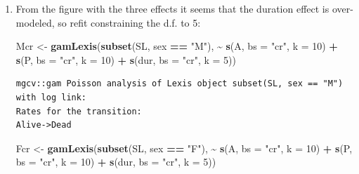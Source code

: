 \documentclass[
]{book}
\newenvironment{Shaded}{\begin{snugshade}}{\end{snugshade}}
\newcommand{\AttributeTok}[1]{\textcolor[rgb]{0.13,0.29,0.53}{#1}}
\newcommand{\DecValTok}[1]{\textcolor[rgb]{0.00,0.00,0.81}{#1}}
\newcommand{\FunctionTok}[1]{\textcolor[rgb]{0.13,0.29,0.53}{\textbf{#1}}}
\newcommand{\NormalTok}[1]{#1}
\newcommand{\OtherTok}[1]{\textcolor[rgb]{0.56,0.35,0.01}{#1}}
\newcommand{\SpecialCharTok}[1]{\textcolor[rgb]{0.81,0.36,0.00}{\textbf{#1}}}
\newcommand{\StringTok}[1]{\textcolor[rgb]{0.31,0.60,0.02}{#1}}
\theoremstyle{definition}
\theoremstyle{definition}
\theoremstyle{definition}
\theoremstyle{definition}
\theoremstyle{remark}
\begin{document}
\begin{enumerate}
  Now take a look at the result from the \texttt{ci.pred} statement and
  construct prediction of mortality for men and women diagnosed in a
  range of ages, say 50, 60, 70, and plot these together in the same
  graph:

\begin{Shaded}
\begin{Highlighting}[]
\FunctionTok{cbind}\NormalTok{(nd, }\FunctionTok{ci.pred}\NormalTok{(Mcr, }\AttributeTok{newdata =}\NormalTok{ nd))[}\DecValTok{1}\SpecialCharTok{:}\DecValTok{10}\NormalTok{,]}
\end{Highlighting}
\end{Shaded}
\item
  From the figure with the three effects it seems that the duration effect is
  over-modeled, so refit constraining the d.f. to 5:

\begin{Shaded}
\begin{Highlighting}[]
\NormalTok{Mcr }\OtherTok{\textless{}{-}} \FunctionTok{gamLexis}\NormalTok{(}\FunctionTok{subset}\NormalTok{(SL, sex }\SpecialCharTok{==} \StringTok{"M"}\NormalTok{),}
                 \SpecialCharTok{\textasciitilde{}} \FunctionTok{s}\NormalTok{(A, }\AttributeTok{bs =} \StringTok{"cr"}\NormalTok{, }\AttributeTok{k =} \DecValTok{10}\NormalTok{) }\SpecialCharTok{+}
                   \FunctionTok{s}\NormalTok{(P, }\AttributeTok{bs =} \StringTok{"cr"}\NormalTok{, }\AttributeTok{k =} \DecValTok{10}\NormalTok{) }\SpecialCharTok{+}
                 \FunctionTok{s}\NormalTok{(dur, }\AttributeTok{bs =} \StringTok{"cr"}\NormalTok{, }\AttributeTok{k =} \DecValTok{5}\NormalTok{))}
\end{Highlighting}
\end{Shaded}

\begin{verbatim}
mgcv::gam Poisson analysis of Lexis object subset(SL, sex == "M") with log link:
Rates for the transition:
Alive->Dead
\end{verbatim}

\begin{Shaded}
\begin{Highlighting}[]
\NormalTok{Fcr }\OtherTok{\textless{}{-}} \FunctionTok{gamLexis}\NormalTok{(}\FunctionTok{subset}\NormalTok{(SL, sex }\SpecialCharTok{==} \StringTok{"F"}\NormalTok{),}
                 \SpecialCharTok{\textasciitilde{}} \FunctionTok{s}\NormalTok{(A, }\AttributeTok{bs =} \StringTok{"cr"}\NormalTok{, }\AttributeTok{k =} \DecValTok{10}\NormalTok{) }\SpecialCharTok{+}
                   \FunctionTok{s}\NormalTok{(P, }\AttributeTok{bs =} \StringTok{"cr"}\NormalTok{, }\AttributeTok{k =} \DecValTok{10}\NormalTok{) }\SpecialCharTok{+}
                 \FunctionTok{s}\NormalTok{(dur, }\AttributeTok{bs =} \StringTok{"cr"}\NormalTok{, }\AttributeTok{k =} \DecValTok{5}\NormalTok{))}
\end{Highlighting}
\end{Shaded}


\end{enumerate}
\end{document}
